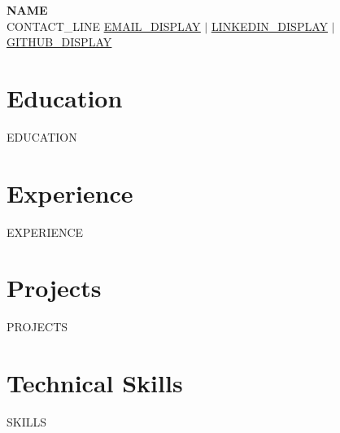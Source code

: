 \documentclass[letterpaper,11pt]{article}
\newcommand{\resumeSubHeadingListStart}{\begin{itemize}[leftmargin=0.15in, label={}]}
\newcommand{\resumeSubHeadingListEnd}{\end{itemize}}
\begin{document}
    \begin{center}
        \textbf{\Huge \scshape {{NAME}}} \\ \vspace{1pt}
        \small {{CONTACT_LINE}}
        \href{{{EMAIL_URL}}}{\underline{{{EMAIL_DISPLAY}}}} $|$
        \href{{{LINKEDIN_URL}}}{\underline{{{LINKEDIN_DISPLAY}}}} $|$
        \href{{{GITHUB_URL}}}{\underline{{{GITHUB_DISPLAY}}}}
    \end{center}

\section{Education}
  \resumeSubHeadingListStart
{{EDUCATION}}
  \resumeSubHeadingListEnd

\section{Experience}
  \resumeSubHeadingListStart
{{EXPERIENCE}}
  \resumeSubHeadingListEnd

\section{Projects}
\resumeSubHeadingListStart
{{PROJECTS}}
\resumeSubHeadingListEnd

\section{Technical Skills}
\begin{itemize}[leftmargin=0.15in, label={}]
    \small{\item{
{{SKILLS}}
    }}
\end{itemize}
\end{document}
